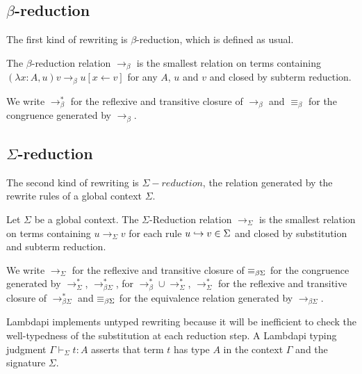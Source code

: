 \subsection{\texorpdfstring{$\beta$}{}-reduction}

The first kind of rewriting is $\beta$-reduction, which is defined as usual.

\begin{definition} The $\beta$-reduction relation $\longrightarrow_\beta$ is the smallest relation on terms containing
\( (\lambda x:A, u)v \longrightarrow_\beta u[x \leftarrow v] \) for any $A$, $u$ and $v$ and closed by subterm reduction.
\end{definition}

\begin{notation}
We write $\longrightarrow^*_\beta$ for the reflexive and transitive closure of $\longrightarrow_\beta$ and $\equiv_\beta$ for the congruence generated by $\longrightarrow_\beta$.
\end{notation}

\subsection{\texorpdfstring{$\Sigma$}{}-reduction}

The second kind of rewriting is $\Sigma-reduction$, the relation generated by the rewrite rules of a global context $\Sigma$.

\begin{definition}
Let $\Sigma$ be a global context. The  $\Sigma$-Reduction relation $\longrightarrow_\Sigma$ is the smallest relation on terms containing $u \longrightarrow_\Sigma v$
for each rule $u \hookrightarrow v \in \Sigma$ and closed by substitution and subterm reduction.
\end{definition}

\begin{notation}
We write $\longrightarrow_{\Sigma}$ for the reflexive and transitive closure of $\equiv_{\beta\Sigma}$ for the congruence generated by $\longrightarrow^*_{\Sigma}$, $\longrightarrow^*_{\beta\Sigma}$,
for $\longrightarrow^*_{\beta} \cup \longrightarrow^*_{\Sigma}$, $\longrightarrow^*_{\Sigma}$ for the reflexive and transitive closure of $\longrightarrow^*_{\beta\Sigma}$ and $\equiv_{\beta\Sigma}$
for the equivalence relation generated by $\longrightarrow_{\beta\Sigma}$.
\end{notation}

Lambdapi implements untyped rewriting because it will be inefficient to check the well-typedness of the substitution at each reduction step.
A Lambdapi typing judgment $\Gamma \vdash_\Sigma t : A$ asserts that term $t$ has type $A$ in the context $\Gamma$ and the signature $\Sigma$.

